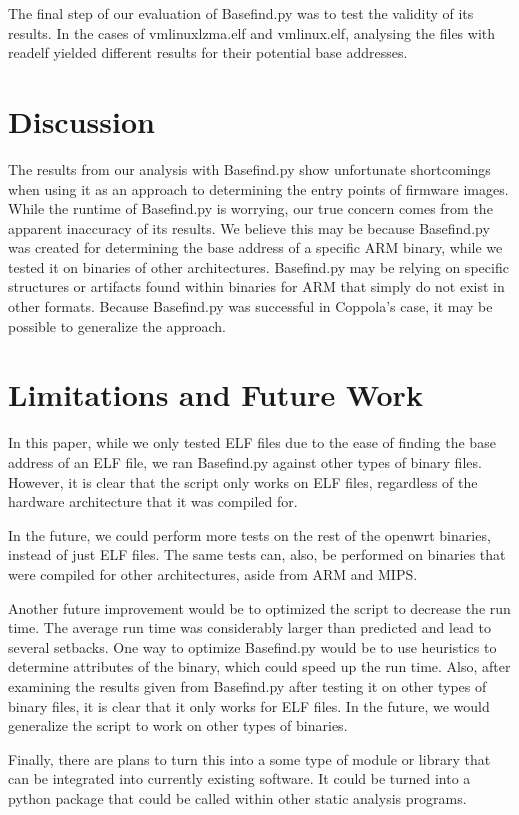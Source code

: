 \documentclass[letterpaper,twocolumn,10pt]{article}
\begin{document}
The final step of our evaluation of Basefind.py was to test the validity of its results. In the cases of vmlinuxlzma.elf and vmlinux.elf, analysing the files with readelf yielded different results for their potential base addresses.  

\section{Discussion}
The results from our analysis with Basefind.py show unfortunate shortcomings when using it as an approach to determining the entry points of firmware images. While the runtime of Basefind.py is worrying, our true concern comes from the apparent inaccuracy of its results. We believe this may be because Basefind.py was created for determining the base address of a specific ARM binary, while we tested it on binaries of other architectures. Basefind.py may be relying on specific structures or artifacts found within binaries for ARM that simply do not exist in other formats. Because Basefind.py was successful in Coppola's case, it may be possible to generalize the approach.

\section{Limitations and Future Work}
In this paper, while we only tested ELF files due to the ease of finding the base address of an ELF file, we ran Basefind.py against other types of binary files. However, it is clear that the script only works on ELF files, regardless of the hardware architecture that it was compiled for. 

In the future, we could perform more tests on the rest of the openwrt binaries, instead of just ELF files. The same tests can, also, be performed on binaries that were compiled for other architectures, aside from ARM and MIPS. 

Another future improvement would be to optimized the script to decrease the run time. The average run time was considerably larger than predicted and lead to several setbacks. One way to optimize Basefind.py would be to use heuristics to determine attributes of the binary, which could speed up the run time. Also, after examining the results given from Basefind.py after testing it on other types of binary files, it is clear that it only works for ELF files. In the future, we would generalize the script to work on other types of binaries. 

Finally, there are plans to turn this into a some type of module or library that can be integrated into currently existing software. It could be turned into a python package that could be called within other static analysis programs. 
\end{document}
